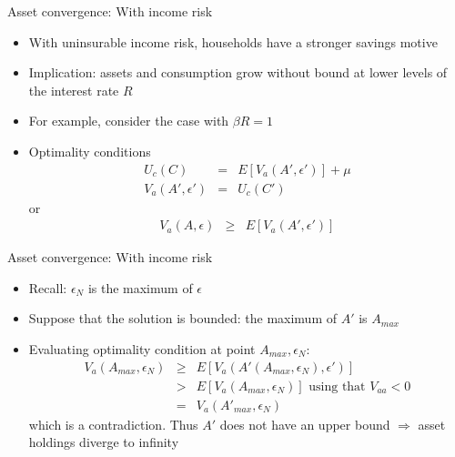 \documentclass[9pt]{beamer}
\newcommand{\bit}{\begin{itemize}}
\newcommand{\eit}{\end{itemize}}
\begin{document}
\begin{frame}{Asset convergence: With income risk}

\bit
\setlength\itemsep{1.5em}

\item With uninsurable income risk, households have a stronger savings motive

\item Implication: assets and consumption grow without bound at lower levels of the interest rate $R$

\item For example, consider the case with $\beta R = 1$

\item Optimality conditions
\begin{eqnarray}
U_c(C) &=&  E\left[V_a(A', \epsilon')\right] + \mu \nonumber \\
V_a(A', \epsilon') &=& U_c(C') \nonumber
\end{eqnarray}
or
\begin{eqnarray} 
V_a(A, \epsilon) &\geq &  E\left[V_a(A', \epsilon')\right] \nonumber
\end{eqnarray}

\eit

\end{frame}

\begin{frame}{Asset convergence: With income risk}

\bit
\setlength\itemsep{1.5em}

\item Recall: $\epsilon_N$ is the maximum of $\epsilon$

\item Suppose that the solution is bounded: the maximum of $A'$ is $A_{max}$

\item Evaluating optimality condition at point $A_{max}, \epsilon_N$:
\begin{eqnarray}
V_a(A_{max}, \epsilon_N) &\geq& E\left[V_a(A'(A_{max}, \epsilon_N), \epsilon')\right]\nonumber\\
&>& E\left[V_a(A_{max}, \epsilon_N)\right]\nonumber \text{ using that } V_{aa}<0 \nonumber\\
&=& V_a(A'_{max}, \epsilon_N) \nonumber 
\end{eqnarray}
which is a contradiction. Thus $A'$ does not have an upper bound $\Rightarrow$ asset holdings diverge to infinity

\eit

\end{frame}
\end{document}
